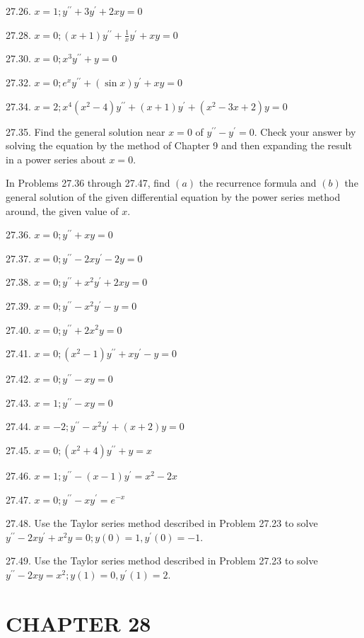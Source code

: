 \documentclass[10pt]{article}
\begin{document}
27.26. $x=1 ; y^{\prime \prime}+3 y^{\prime}+2 x y=0$

27.28. $x=0 ;(x+1) y^{\prime \prime}+\frac{1}{x} y^{\prime}+x y=0$

27.30. $x=0 ; x^{3} y^{\prime \prime}+y=0$

27.32. $x=0 ; e^{x} y^{\prime \prime}+(\sin x) y^{\prime}+x y=0$

27.34. $x=2 ; x^{4}\left(x^{2}-4\right) y^{\prime \prime}+(x+1) y^{\prime}+\left(x^{2}-3 x+2\right) y=0$

27.35. Find the general solution near $x=0$ of $y^{\prime \prime}-y^{\prime}=0$. Check your answer by solving the equation by the method of Chapter 9 and then expanding the result in a power series about $x=0$.

In Problems 27.36 through 27.47, find $(a)$ the recurrence formula and $(b)$ the general solution of the given differential equation by the power series method around, the given value of $x$.

27.36. $x=0 ; y^{\prime \prime}+x y=0$

27.37. $x=0 ; y^{\prime \prime}-2 x y^{\prime}-2 y=0$

27.38. $x=0 ; y^{\prime \prime}+x^{2} y^{\prime}+2 x y=0$

27.39. $x=0 ; y^{\prime \prime}-x^{2} y^{\prime}-y=0$

27.40. $x=0 ; y^{\prime \prime}+2 x^{2} y=0$

27.41. $x=0 ;\left(x^{2}-1\right) y^{\prime \prime}+x y^{\prime}-y=0$

27.42. $x=0 ; y^{\prime \prime}-x y=0$

27.43. $x=1 ; y^{\prime \prime}-x y=0$

27.44. $x=-2 ; y^{\prime \prime}-x^{2} y^{\prime}+(x+2) y=0$

27.45. $x=0 ;\left(x^{2}+4\right) y^{\prime \prime}+y=x$

27.46. $x=1 ; y^{\prime \prime}-(x-1) y^{\prime}=x^{2}-2 x$

27.47. $x=0 ; y^{\prime \prime}-x y^{\prime}=e^{-x}$

27.48. Use the Taylor series method described in Problem 27.23 to solve $y^{\prime \prime}-2 x y^{\prime}+x^{2} y=0 ; y(0)=1, y^{\prime}(0)=-1$.

27.49. Use the Taylor series method described in Problem 27.23 to solve $y^{\prime \prime}-2 x y=x^{2} ; y(1)=0, y^{\prime}(1)=2$.

\section*{CHAPTER 28}
\end{document}
